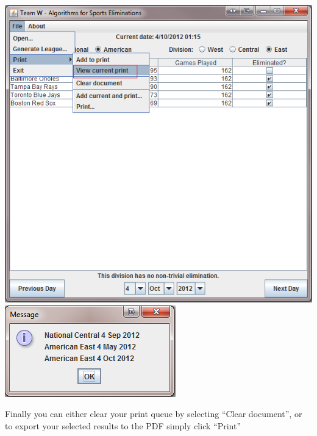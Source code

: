 \includegraphics[width=\linewidth,keepaspectratio]{images/userManualDesk11.png}
\includegraphics[width=\linewidth,keepaspectratio]{images/userManualDesk12.png}

Finally you can either clear your print queue by selecting ``Clear document'', or
to export your selected results to the PDF simply click ``Print''

